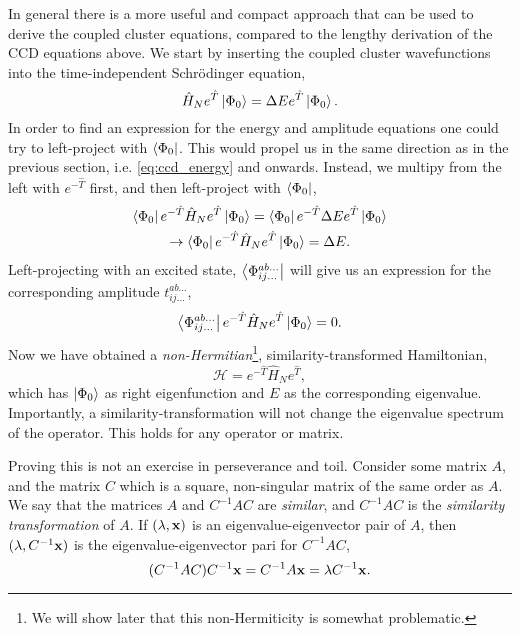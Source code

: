 In general there is a more useful and compact approach that can be used to derive 
the coupled cluster equations, compared to the lengthy derivation of the CCD 
equations above. We start by inserting the coupled cluster wavefunctions into the 
time-independent Schrödinger equation,
\begin{equation}
    \hat{H}_Ne^{\hat{T}}\ket{\Phi_0} = \Delta E e^{\hat{T}}\ket{\Phi_0}.
\end{equation} 
In order to find an expression for the energy and amplitude equations one could 
try to left-project with $\bra{\Phi_0}$. This would propel us in the same 
direction as in the previous section, i.e. \autoref{eq:ccd_energy} and onwards.
Instead, we multipy 
from the left with $e^{-\hat{T}}$ first, and then left-project with $\bra{\Phi_0}$,
\begin{equation}
    \label{eq:cc_energy}
    \begin{gathered}
    \bra{\Phi_0} e^{-\hat{T}}\hat{H}_Ne^{\hat{T}} \ket{\Phi_0} 
    = \bra{\Phi_0} e^{-\hat{T}} \Delta E e^{\hat{T}} \ket{\Phi_0} \\
    \to \bra{\Phi_0} e^{-\hat{T}} \hat{H}_N e^{\hat{T}} \ket{\Phi_0}
    = \Delta E.
    \end{gathered}
\end{equation}
Left-projecting with an excited state, $\bra{\Phi^{ab\dots}_{ij\dots}}$ will give us 
an expression for the corresponding amplitude $t^{ab\dots}_{ij\dots}$,
\begin{equation}
    \label{eq:cc_amplitude}
    \bra{\Phi^{ab\dots}_{ij\dots}} e^{-\hat{T}}\hat{H}_Ne^{\hat{T}}\ket{\Phi_0} = 0.
\end{equation}
Now we have obtained a \emph{non-Hermitian}\footnote{We will show later that this 
non-Hermiticity is somewhat problematic.}, similarity-transformed Hamiltonian,
\begin{equation}
    \mathscr{H} = e^{-\hat{T}}\hat{H}_Ne^{\hat{T}},
\end{equation}
which has $\ket{\Phi_0}$ as right eigenfunction and $E$ as the corresponding eigenvalue.
Importantly, a similarity-transformation will not change the eigenvalue spectrum of the 
operator. This holds for any operator or matrix. 

Proving this is not an exercise in perseverance and toil.
Consider some matrix $A$, and the matrix $C$ which is a square, non-singular 
matrix of the same order as $A$. We say that the matrices $A$ and
$C^{-1}AC$ are \emph{similar}, and $C^{-1}AC$ is the \emph{similarity transformation}
of $A$. If $(\lambda, \vb{x})$ is an
eigenvalue-eigenvector pair of $A$, then $(\lambda, C^{-1}\vb{x})$ is the 
eigenvalue-eigenvector pari for $C^{-1}AC$,
\begin{equation}
    (C^{-1}AC)C^{-1}\vb{x} = C^{-1}A\vb{x} = \lambda C^{-1}\vb{x}.
\end{equation}

